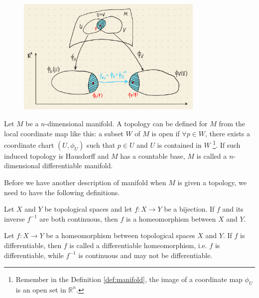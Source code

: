 \documentclass[11pt, a4paper]{book}
\begin{document}
\begin{figure}[htbp]
  \centering
  \includegraphics[width=0.8\textwidth, height=\textheight, keepaspectratio]{figures/manifold-draft}
  \caption{}
  \label{fig:manifold}
\end{figure}

\begin{Definition}
  Let $M$ be a $n$-dimensional manifold. A topology can be defined for $M$ from the local
  coordinate map like this: a subset $W$ of $M$ is open if $\forall p \in W$, there exists
  a coordinate chart $(U, \phi_U)$ such that $p \in U$ and $U$ is contained in $W$
  \footnote{Remember in the Definition \ref{def:manifold}, the image of a coordinate map
    $\phi_U$ is an open set in $\mathbb{R}^n$.}. If such induced topology is Hausdorff and
  $M$ has a countable base, $M$ is called a $n$-dimensional differentiable manifold.
\end{Definition}

Before we have another description of manifold when $M$ is given a topology, we
need to have the following definitions.

\begin{Definition}[Homeomorphism]
  Let $X$ and $Y$ be topological spaces and let $f: X \rightarrow Y$ be a
  bijection. If $f$ and its inverse $f^{-1}$ are both continuous, then $f$ is a
  homeomorphism between $X$ and $Y$.
\end{Definition}


\begin{Definition}
  Let $f: X \rightarrow Y$ be a homeomorphism between topological spaces $X$ and $Y$. If
  $f$ is differentiable, then $f$ is called a differentiable homeomorphism, i.e. $f$ is
  differentiable, while $f^{-1}$ is continuous and may not be differentiable.
\end{Definition}
\end{document}
